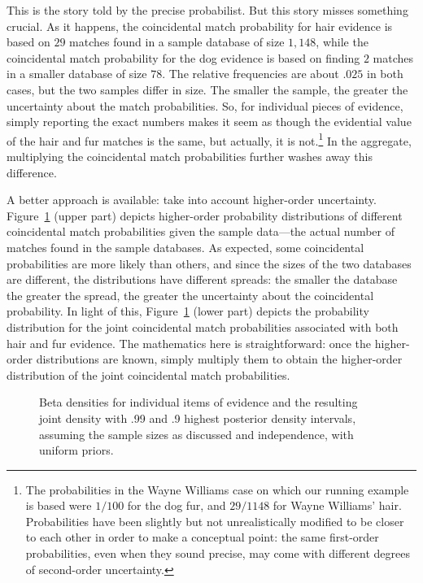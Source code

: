 \documentclass[
  letterpaper,
  DIV=11,
  numbers=noendperiod]{scrartcl}
\begin{document}
This is the story told by the precise probabilist. But this story misses
something crucial. As it happens, the coincidental match probability for
hair evidence is based on \(29\) matches found in a sample database of
size \(1,148\), while the coincidental match probability for the dog
evidence is based on finding \(2\) matches in a smaller database of size
\(78\). The relative frequencies are about \(.025\) in both cases, but
the two samples differ in size. The smaller the sample, the greater the
uncertainty about the match probabilities. So, for individual pieces of
evidence, simply reporting the exact numbers makes it seem as though the
evidential value of the hair and fur matches is the same, but actually,
it is not.\footnote{The probabilities in the Wayne Williams case on
  which our running example is based were \(1/100\) for the dog fur, and
  \(29/1148\) for Wayne Williams' hair. Probabilities have been slightly
  but not unrealistically modified to be closer to each other in order
  to make a conceptual point: the same first-order probabilities, even
  when they sound precise, may come with different degrees of
  second-order uncertainty.} In the aggregate, multiplying the
coincidental match probabilities further washes away this difference.

A better approach is available: take into account higher-order
uncertainty. Figure~\ref{fig-densities} (upper part) depicts
higher-order probability distributions of different coincidental match
probabilities given the sample data---the actual number of matches found
in the sample databases. As expected, some coincidental probabilities
are more likely than others, and since the sizes of the two databases
are different, the distributions have different spreads: the smaller the
database the greater the spread, the greater the uncertainty about the
coincidental probability. In light of this, Figure~\ref{fig-densities}
(lower part) depicts the probability distribution for the joint
coincidental match probabilities associated with both hair and fur
evidence. The mathematics here is straightforward: once the higher-order
distributions are known, simply multiply them to obtain the higher-order
distribution of the joint coincidental match probabilities.

\begin{figure}[H]


\caption{\label{fig-densities}Beta densities for individual items of
evidence and the resulting joint density with .99 and .9 highest
posterior density intervals, assuming the sample sizes as discussed and
independence, with uniform priors.}

\end{figure}%
\end{document}
